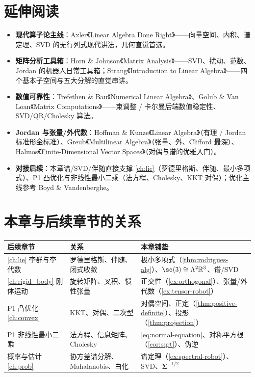 \section*{延伸阅读}
\begin{itemize}
  \item \textbf{现代算子论主线}：Axler《Linear Algebra Done Right》\cite{axler2024ladr}——向量空间、内积、谱定理、SVD 的无行列式现代讲法，几何直觉首选。
  \item \textbf{矩阵分析工具箱}：Horn \& Johnson《Matrix Analysis》\cite{hornjohnson2013}——SVD、扰动、范数、Jordan 的机器人日常工具箱；Strang《Introduction to Linear Algebra》\cite{strang2023intro}——四个基本子空间与五大分解的直觉串讲。
  \item \textbf{数值可靠性}：Trefethen \& Bau《Numerical Linear Algebra》\cite{trefethenbau1997}、Golub \& Van Loan《Matrix Computations》\cite{golubvanloan2013}——束调整 / 卡尔曼后端数值稳定性、SVD/QR/Cholesky 算法。
  \item \textbf{Jordan 与张量/外代数}：Hoffman \& Kunze《Linear Algebra》\cite{hoffmankunze1971}（有理 / Jordan 标准形金标准）、Greub《Multilinear Algebra》\cite{greub1978multilinear}（张量、外、Clifford 最深）、Halmos《Finite-Dimensional Vector Spaces》\cite{halmos1958fdvs}（对偶与谱的优雅入门）。
  \item \textbf{对接后续}：本章谱/SVD/伴随直接支撑 \cref{ch:lie}（罗德里格斯、伴随、最小多项式）、P1 凸优化与非线性最小二乘（法方程、Cholesky、KKT 对偶）；优化主线参考 Boyd \& Vandenberghe\cite{boyd2004convex}。
\end{itemize}

\section*{本章与后续章节的关系}
\begin{table}[H]\centering\small
\begin{tabular}{lll}
\toprule
后续章节 & 关系 & 本章铺垫 \\
\midrule
\cref{ch:lie} 李群与李代数 & 罗德里格斯、伴随、闭式收敛 & 极小多项式（\cref{thm:rodrigues-alg}）、$\so(3)\cong\Lambda^2\mathbb{R}^3$、谱/SVD \\
\cref{ch:rigid_body} 刚体运动 & 旋转矩阵、叉积、惯性张量 & 正交性（\cref{ex:orthogonal}）、张量/外代数（\cref{ex:tensor-robot}）\\
P1 凸优化 \cref{ch:convex} & KKT、对偶、二次型 & 对偶空间、正定（\cref{thm:positive-definite}）、投影（\cref{thm:projection}）\\
P1 非线性最小二乘 & 法方程、信息矩阵、Cholesky & \cref{eq:normal-equation}、对称平方根（\cref{cor:sqrt}）、伪逆 \\
概率与估计 \cref{ch:prob} & 协方差谱分解、Mahalanobis、白化 & 谱定理（\cref{ex:spectral-robot}）、SVD、$\boldsymbol{\Sigma}^{-1/2}$ \\
\bottomrule
\end{tabular}
\end{table}

